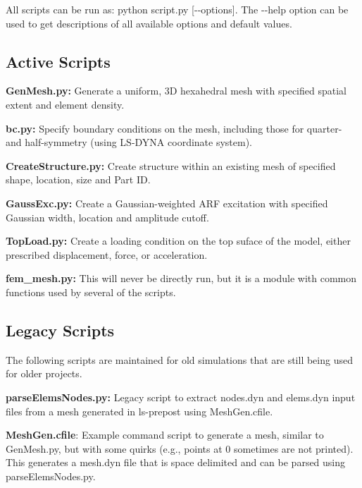 All scripts can be run as\+: {\ttfamily python script.\+py \mbox{[}-\/-\/options\mbox{]}}. The {\ttfamily -\/-\/help} option can be used to get descriptions of all available options and default values.

\subsection*{Active Scripts }


\begin{DoxyItemize}
\item {\bfseries Gen\+Mesh.\+py\+:} Generate a uniform, 3\+D hexahedral mesh with specified spatial extent and element density.
\item {\bfseries bc.\+py\+:} Specify boundary conditions on the mesh, including those for quarter-\/ and half-\/symmetry (using L\+S-\/\+D\+Y\+N\+A coordinate system).
\item {\bfseries Create\+Structure.\+py\+:} Create structure within an existing mesh of specified shape, location, size and Part I\+D.
\item {\bfseries Gauss\+Exc.\+py\+:} Create a Gaussian-\/weighted A\+R\+F excitation with specified Gaussian width, location and amplitude cutoff.
\item {\bfseries Top\+Load.\+py\+:} Create a loading condition on the top suface of the model, either prescribed displacement, force, or acceleration.
\item {\bfseries fem\+\_\+mesh.\+py\+:} This will never be directly run, but it is a module with common functions used by several of the scripts.
\end{DoxyItemize}

\subsection*{Legacy Scripts }

The following scripts are maintained for old simulations that are still being used for older projects.


\begin{DoxyItemize}
\item {\bfseries parse\+Elems\+Nodes.\+py\+:} Legacy script to extract {\ttfamily nodes.\+dyn} and {\ttfamily elems.\+dyn} input files from a mesh generated in ls-\/prepost using {\ttfamily Mesh\+Gen.\+cfile}.
\item {\bfseries Mesh\+Gen.\+cfile}\+: Example command script to generate a mesh, similar to {\ttfamily Gen\+Mesh.\+py}, but with some quirks (e.\+g., points at 0 sometimes are not printed). This generates a {\ttfamily mesh.\+dyn} file that is space delimited and can be parsed using {\ttfamily parse\+Elems\+Nodes.\+py}. 
\end{DoxyItemize}